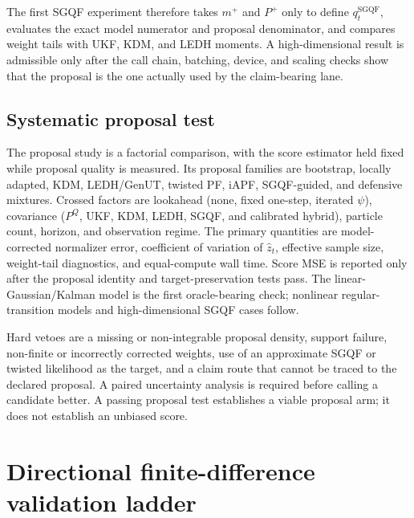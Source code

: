 \documentclass[11pt]{article}
\begin{document}
The first SGQF experiment therefore takes $m^+$ and $P^+$ only to define
$q_t^{\mathrm{SGQF}}$, evaluates the exact model numerator and proposal
denominator, and compares weight tails with UKF, KDM, and LEDH moments. A
high-dimensional result is admissible only after the call chain, batching,
device, and scaling checks show that the proposal is the one actually used by
the claim-bearing lane.

\subsection{Systematic proposal test}

The proposal study is a factorial comparison, with the score estimator held
fixed while proposal quality is measured. Its proposal families are bootstrap,
locally adapted, KDM, LEDH/GenUT, twisted PF, iAPF, SGQF-guided, and defensive
mixtures. Crossed factors are lookahead (none, fixed one-step, iterated $\psi$),
covariance ($P^Q$, UKF, KDM, LEDH, SGQF, and calibrated hybrid), particle count,
horizon, and observation regime. The primary quantities are model-corrected
normalizer error, coefficient of variation of $\widehat z_t$, effective sample
size, weight-tail diagnostics, and equal-compute wall time. Score MSE is
reported only after the proposal identity and target-preservation tests pass.
The linear-Gaussian/Kalman model is the first oracle-bearing check; nonlinear
regular-transition models and high-dimensional SGQF cases follow.

Hard vetoes are a missing or non-integrable proposal density, support failure,
non-finite or incorrectly corrected weights, use of an approximate SGQF or
twisted likelihood as the target, and a claim route that cannot be traced to the
declared proposal. A paired uncertainty analysis is required before calling a
candidate better. A passing proposal test establishes a viable proposal arm;
it does not establish an unbiased score.

\section{Directional finite-difference validation ladder}
\label{sec:fd-ladder}
\end{document}
